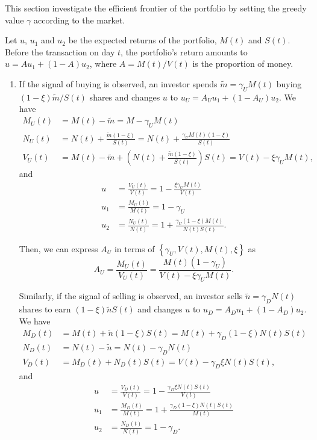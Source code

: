 \documentclass[runningheads]{llncs}
\begin{document}
This section investigate the efficient frontier of the portfolio by setting the greedy value $\gamma$ according to the market.

Let $u$, $u_1$ and $u_2$ be the expected returns of the portfolio, $M(t)$ and $S(t)$. Before the transaction on day $t$, the portfolio's return amounts to $u = Au_1 + (1-A)u_2$, where $A=M(t)/V(t)$ is the proportion of money.

\begin{enumerate}
    \item If the signal of buying is observed, an investor spends $\tilde{m}=\gamma_U M(t)$ buying $(1-\xi)\tilde{m}/S(t)$ shares and changes $u$ to $u_U=A_U u_1 + (1-A_U)u_2$. We have
\begin{align}
    M_U(t)&=M(t)-\tilde{m}=M-\gamma_U M(t)\\
    N_U(t)&=N(t)+\frac{\tilde{m}(1-\xi)}{S(t)}=N(t)+\frac{\gamma_U M(t)(1-\xi)}{S(t)}\\
    V_U(t)&=M(t)-\tilde{m}+\left( N(t)+\frac{\tilde{m}(1-\xi)}{S(t)} \right) S(t)=V(t)-\xi\gamma_U M(t),
\end{align}
and
\begin{align}
    u&=\frac{V_U(t)}{V(t)}=1-\frac{\xi\gamma_U M(t)}{V(t)}\\
    u_1&=\frac{M_U(t)}{M(t)}=1-\gamma_U\\
    u_2&=\frac{N_U(t)}{N(t)}=1+\frac{\gamma_U(1-\xi)M(t)}{N(t)S(t)}.
\end{align}

Then, we can express $A_U$ in terms of $\left\{\gamma_U, V(t), M(t), \xi\right\}$ as
\begin{equation}\label{eq:au}
    A_U=\frac{M_U(t)}{V_U(t)}=\frac{M(t)\left( 1-\gamma_U \right) }{V(t)-\xi\gamma_U M(t)}.
\end{equation}

Similarly, if the signal of selling is observed, an investor sells $\tilde{n}=\gamma_D N(t)$ shares to earn $(1-\xi)\tilde{n}S(t)$ and changes $u$ to $u_D=A_D u_1 + (1-A_D)u_2$. We have
\begin{align}
    M_D(t)&=M(t)+\tilde{n}(1-\xi)S(t)=M(t)+\gamma_D(1-\xi) N(t)S(t)\\
    N_D(t)&=N(t)-\tilde{n}=N(t)-\gamma_D N(t)\\
    V_D(t)&=M_D(t)+N_D(t)S(t)=V(t)-\gamma_D\xi N(t)S(t),
\end{align}
and
\begin{align}
    u&=\frac{V_D(t)}{V(t)}=1-\frac{\gamma_D\xi N(t)S(t)}{V(t)}\\
    u_1&=\frac{M_D(t)}{M(t)}=1+\frac{\gamma_D(1-\xi) N(t)S(t)}{M(t)}\\
    u_2&=\frac{N_D(t)}{N(t)}=1-\gamma_D.
\end{align}
    

\end{enumerate}
\end{document}
